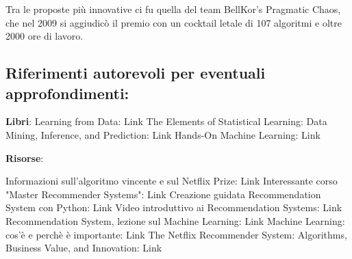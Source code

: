 Tra le proposte più innovative ci fu quella del team BellKor’s Pragmatic Chaos, che nel 2009 si aggiudicò il premio con un cocktail letale di 107 algoritmi e oltre 2000 ore di lavoro.
\subsection*{Riferimenti autorevoli per eventuali approfondimenti:}
\textbf{Libri}:
Learning from Data: Link
The Elements of Statistical Learning: Data Mining, Inference, and Prediction: Link
Hands-On Machine Learning: Link

\textbf{Risorse}:

Informazioni sull'algoritmo vincente e sul Netflix Prize: Link
Interessante corso "Master Recommender Systems": Link
Creazione guidata Recommendation System con Python: Link
Video introduttivo ai Recommendation Systems: Link
Recommendation System, lezione sul Machine Learning: Link
Machine Learning: cos'è e perchè è importante: Link
The Netflix Recommender System: Algorithms, Business Value, and Innovation: Link


